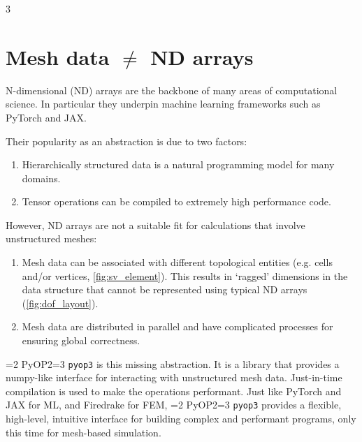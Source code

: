 \documentclass[
]{ImperialPoster}
\def\pyop#1{\ifnum#1=2 {PyOP2}\else \ifnum#1=3 {\texttt{pyop3}}\fi \fi}
\newcommand{\myblue}[1]{\textcolor{ICLBlue}{#1}}
\begin{document}
\titlesection

\begin{multicols}{3}


\vspace{-1em}
\section{Mesh data $\neq$ ND arrays}
\vspace{-.8em}

N-dimensional (ND) arrays are the backbone of many areas of computational science. In particular they underpin machine learning frameworks such as PyTorch\cite{pytorch} and JAX\cite{jax}.

Their popularity as an abstraction is due to two factors:
\vspace{-1em}
\begin{enumerate}
	\item
		Hierarchically structured data is a natural programming model for many domains.
	\item
		Tensor operations can be compiled to extremely high performance code.
\end{enumerate}

However, ND arrays are not a suitable fit for calculations that involve unstructured meshes:
\vspace{-1em}
\begin{enumerate}
	\item
		Mesh data can be associated with different topological entities (e.g. cells and/or vertices, \cref{fig:sv_element}).
		This results in `ragged' dimensions in the data structure that cannot be represented using typical ND arrays (\cref{fig:dof_layout}).
	\item
		Mesh data are distributed in parallel and have complicated processes for ensuring global correctness.
\end{enumerate}

\myblue{\pyop3 is this missing abstraction.}
It is a library that provides a \myblue{numpy-like interface for interacting with unstructured mesh data}.
\myblue{Just-in-time compilation} is used to make the operations performant.
Just like PyTorch and JAX for ML, and Firedrake for FEM\cite{firedrake}, \pyop3 provides a flexible, high-level, intuitive interface for building complex and performant programs, only this time for mesh-based simulation.


\end{multicols}
\end{document}
